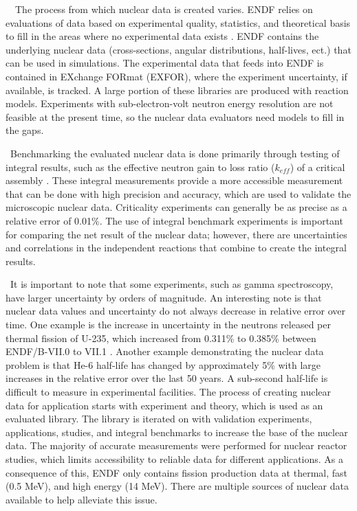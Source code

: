 \
\ The process from which nuclear data is created varies. ENDF relies on evaluations of data based on experimental quality, statistics, and theoretical basis to fill in the areas where no experimental data exists \cite{Brown2015}. ENDF contains the underlying nuclear data (cross-sections, angular distributions, half-lives, ect.) that can be used in simulations. The experimental data that feeds into ENDF is contained in EXchange FORmat (EXFOR), where the experiment uncertainty, if available, is tracked. A large portion of these libraries are produced with reaction models. Experiments with sub-electron-volt neutron energy resolution are not feasible at the present time, so the nuclear data evaluators need models to fill in the gaps.   

\ Benchmarking the evaluated nuclear data is done primarily through testing of integral results, such as the effective neutron gain to loss ratio ($k_{eff}$) of a critical assembly \cite{Brown2015}. These integral measurements provide a more accessible measurement that can be done with high precision and accuracy, which are used to validate the microscopic nuclear data. Criticality experiments can generally be as precise as a relative error of 0.01\%\cite{Brown2015}. The use of integral benchmark experiments is important for comparing the net result of the nuclear data; however, there are uncertainties and correlations in the independent reactions that combine to create the integral results. 

\ It is important to note that some experiments, such as gamma spectroscopy, have larger uncertainty by orders of magnitude. An interesting note is that nuclear data values and uncertainty do not always decrease in relative error over time. One example is the increase in uncertainty in the neutrons released per thermal fission of U-235, which increased from 0.311\% to 0.385\% between ENDF/B-VII.0 to VII.1 \cite{Bostelmann2017}. Another example demonstrating the nuclear data problem is that He-6 half-life has changed by approximately 5\% with large increases in the relative error over the last 50 years\cite{he6}. A sub-second half-life is difficult to measure in experimental facilities. The process of creating nuclear data for application starts with experiment and theory, which is used as an evaluated library. The library is iterated on with validation experiments, applications, studies, and integral benchmarks to increase the base of the nuclear data\cite{Brown2015}. The majority of accurate measurements were performed for nuclear reactor studies, which limits accessibility to reliable data for different applications. As a consequence of this, ENDF only contains fission production data at thermal, fast (0.5 MeV), and high energy (14 MeV). There are multiple sources of nuclear data available to help alleviate this issue. 

